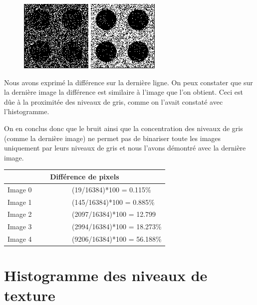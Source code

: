 \documentclass[a4paper,12pt]{report}
\begin{document}
\begin{figure}[!ht]
	\includegraphics[scale=0.3]{image/diff3.png}
	\includegraphics[scale=0.3]{image/diff4.png}
\end{figure}

Nous avons exprimé la différence sur la dernière ligne. On peux constater que sur la dernière image la différence est similaire à l'image que l'on obtient. Ceci est dûe à la proximitée des niveaux de gris, comme on l'avait constaté avec l'histogramme.

On en conclus donc que le bruit ainsi que la concentration des niveaux de gris (comme la dernière image) ne permet pas de binariser toute les images uniquement par leurs niveaux de gris et nous l'avons démontré avec la dernière image.

\begin{center}
\begin{longtable}[c]{|p{0.4\linewidth}| p{0.6\linewidth}|} 

	\hline
		\multicolumn{2}{|c|}{Différence de pixels} \\ \hline
	Image 0	&	(19/16384)*100 = 0.115\%\\ \hline
	Image 1	&	(145/16384)*100 = 0.885\% \\ \hline
	Image 2	&	(2097/16384)*100 = 12.799\\ \hline
	Image 3	&	(2994/16384)*100 = 18.273\%\\ \hline
	Image 4	&	(9206/16384)*100 = 56.188\%\\ \hline
	
\end{longtable}
\end{center}


\section*{Histogramme des niveaux de texture}
\end{document}
